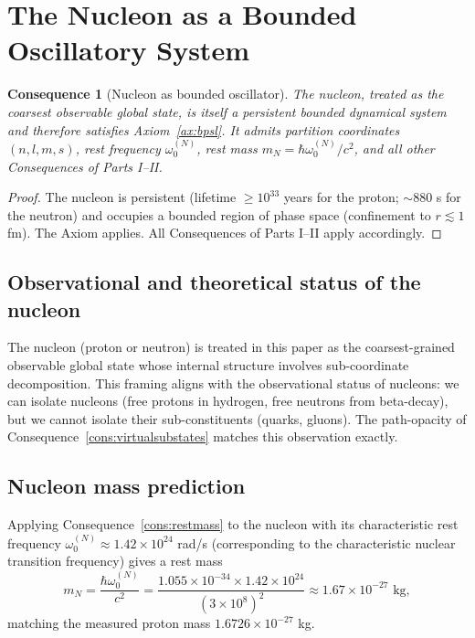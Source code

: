 \documentclass[11pt,twocolumn,a4paper]{article}
\theoremstyle{axiomstyle}
\theoremstyle{conseqstyle}
\newtheorem{consequence}{Consequence}
\theoremstyle{definition}
\theoremstyle{remark}
\begin{document}
\section{The Nucleon as a Bounded Oscillatory System}
\label{sec:nucleonoscillator}

\begin{consequence}[Nucleon as bounded oscillator]
\label{cons:nucleonosc}
The nucleon, treated as the coarsest observable global state, is itself a persistent bounded dynamical system and therefore satisfies Axiom~\ref{ax:bpsl}. It admits partition coordinates $(n,l,m,s)$, rest frequency $\omega_{0}^{(N)}$, rest mass $m_{N}=\hbar\omega_{0}^{(N)}/c^{2}$, and all other Consequences of Parts I--II.
\end{consequence}

\begin{proof}
The nucleon is persistent (lifetime $\ge 10^{33}$ years for the proton; $\sim 880$ s for the neutron) and occupies a bounded region of phase space (confinement to $r\lesssim 1$ fm). The Axiom applies. All Consequences of Parts I--II apply accordingly.
\end{proof}

\subsection{Observational and theoretical status of the nucleon}

The nucleon (proton or neutron) is treated in this paper as the coarsest-grained observable global state whose internal structure involves sub-coordinate decomposition. This framing aligns with the observational status of nucleons: we can isolate nucleons (free protons in hydrogen, free neutrons from beta-decay), but we cannot isolate their sub-constituents (quarks, gluons). The path-opacity of Consequence~\ref{cons:virtualsubstates} matches this observation exactly.

\subsection{Nucleon mass prediction}

Applying Consequence~\ref{cons:restmass} to the nucleon with its characteristic rest frequency $\omega_{0}^{(N)}\approx 1.42\times 10^{24}$ rad/s (corresponding to the characteristic nuclear transition frequency) gives a rest mass
\begin{equation*}
m_{N}=\frac{\hbar\omega_{0}^{(N)}}{c^{2}}=\frac{1.055\times 10^{-34}\times 1.42\times 10^{24}}{(3\times 10^{8})^{2}}\approx 1.67\times 10^{-27}\text{ kg},
\end{equation*}
matching the measured proton mass $1.6726\times 10^{-27}$ kg.
\end{document}
